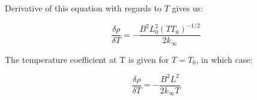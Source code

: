 Derivative of this equation with regards to $T$ gives us:


\begin{equation}\label{eq324}
\frac{\delta \rho}{\delta T} = - \frac{B^2L_0^2(T T_0)^{-1/2}}{2k_{\infty}}
\end{equation}

The temperature coefficient at T is given for $T=T_0$, in which case:


\begin{equation}\label{eq325}
\frac{\delta \rho}{\delta T} = - \frac{B^2L^2}{2k_{\infty}T}
\end{equation}
